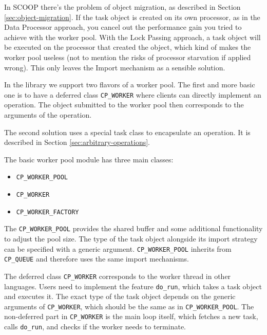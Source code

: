 In SCOOP there's the problem of object migration, as described in Section \ref{sec:object-migration}.
If the task object is created on its own processor, as in the Data Processor approach, you cancel out the performance gain you tried to achieve with the worker pool.
With the Lock Passing approach, a task object will be executed on the processor that created the object, which kind of makes the worker pool useless (not to mention the risks of processor starvation if applied wrong).
This only leaves the Import mechanism as a sensible solution.

In the library we support two flavors of a worker pool.
The first and more basic one is to have a deferred class \lstinline!CP_WORKER! where clients can directly implement an operation.
The object submitted to the worker pool then corresponds to the arguments of the operation.

The second solution uses a special task class to encapsulate an operation.
It is described in Section \ref{sec:arbitrary-operations}.


The basic worker pool module has three main classes:
\begin{itemize}
 \item \lstinline!CP_WORKER_POOL!
 \item \lstinline!CP_WORKER!
 \item \lstinline!CP_WORKER_FACTORY!
\end{itemize}

The \lstinline!CP_WORKER_POOL! provides the shared buffer and some additional functionality to adjust the pool size.
The type of the task object alongside its import strategy can be specified with a generic argument.
\lstinline!CP_WORKER_POOL! inherits from \lstinline!CP_QUEUE! and therefore uses the same import mechanisms.

The deferred class \lstinline!CP_WORKER! corresponds to the worker thread in other languages.
Users need to implement the feature \lstinline!do_run!, which takes a task object and executes it.
The exact type of the task object depends on the generic arguments of \lstinline!CP_WORKER!, which should be the same as in \lstinline!CP_WORKER_POOL!.
The non-deferred part in \lstinline!CP_WORKER! is the main loop itself, which fetches a new task, calls \lstinline!do_run!, and checks if the worker needs to terminate.

